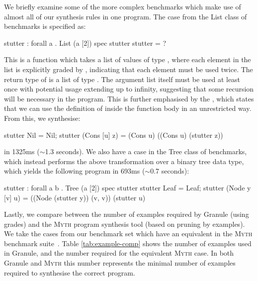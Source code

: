 We briefly examine some of the more complex benchmarks which make use
of almost all of our synthesis rules in one program. The
 case from the List class of benchmarks is specified as:
%
\begin{granule}
stutter : forall a . List (a [2]) %
spec
    stutter %
stutter = ?
\end{granule}
%
This is a function which takes a list of values of type , where each
element in the list is explicitly graded by , indicating that each
element must be used twice. The return type of  is a list of
type . The argument list itself must be used at least once with
potential usage extending up to infinity, suggesting that some recursion will be
necessary in the program. This is further emphasised by the , which
states that we can use the definition of  inside the function
body in an unrestricted way. From this, we synthesise:
%
\begin{granule}
stutter Nil = Nil;
stutter (Cons [u] z) = (Cons u) ((Cons u) (stutter z))
\end{granule}
%
in 1325ms ($\sim$1.3 seconds).
We also have a  case in the Tree class of benchmarks, which instead performs
the above transformation over a binary tree data type, which yields the following program
in 693ms ($\sim$0.7 seconds):
\begin{granule}
stutter : forall a b . Tree (a [2]) %
spec
    stutter %
stutter Leaf = Leaf;
stutter (Node y [v] u) = ((Node (stutter y)) (v, v)) (stutter u)
\end{granule}
%
Lastly, we compare between the number of examples required by Granule (using grades)
and the \textsc{Myth} program synthesis tool (based on pruning by examples).
We take the cases from our benchmark set which have an equivalent in the \textsc{Myth} benchmark suite~\citep{oseraMYTH1}.
Table \ref{tab:example-comp} shows the number of examples used in Granule,
and the number required for the equivalent \textsc{Myth} case. In both Granule and \textsc{Myth} this number represents
the minimal number of examples required to synthesise the correct program.


